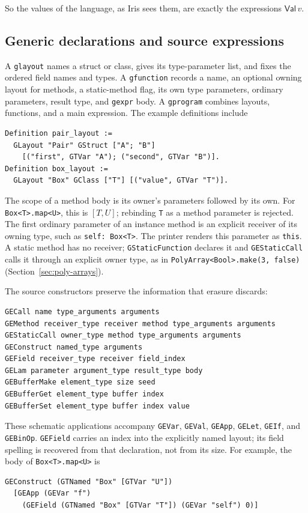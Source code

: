 \documentclass[11pt]{article}
\begin{document}
So the values of the language, as Iris sees them, are exactly the expressions \(\mathsf{Val}\,v\).

\subsection{Generic declarations and source expressions}
\label{sec:generic-source}

A \texttt{glayout} names a struct or class, gives its type-parameter list,
and fixes the ordered field names and types. A \texttt{gfunction} records
a name, an optional owning layout for methods, a static-method flag, its own type parameters,
ordinary parameters, result type, and \texttt{gexpr} body. A \texttt{gprogram}
combines layouts, functions, and a main expression. The example definitions
include
\begin{lstlisting}
Definition pair_layout :=
  GLayout "Pair" GStruct ["A"; "B"]
    [("first", GTVar "A"); ("second", GTVar "B")].
Definition box_layout :=
  GLayout "Box" GClass ["T"] [("value", GTVar "T")].
\end{lstlisting}
The scope of a method body is its owner's parameters followed by its own.
For \texttt{Box<T>.map<U>}, this is \([T,U]\); rebinding \texttt{T} as a
method parameter is rejected. The first ordinary parameter of an instance method is
an explicit receiver of its owning type, such as \texttt{self: Box<T>}.
The printer renders this parameter as \texttt{this}. A static method has
no receiver; \texttt{GStaticFunction} declares it and \texttt{GEStaticCall}
calls it through an explicit owner type, as in
\texttt{PolyArray<Bool>.make(3, false)} (Section~\ref{sec:poly-arrays}).

The source constructors preserve the information that erasure discards:
\begin{lstlisting}
GECall name type_arguments arguments
GEMethod receiver_type receiver method type_arguments arguments
GEStaticCall owner_type method type_arguments arguments
GEConstruct named_type arguments
GEField receiver_type receiver field_index
GELam parameter argument_type result_type body
GEBufferMake element_type size seed
GEBufferGet element_type buffer index
GEBufferSet element_type buffer index value
\end{lstlisting}
These schematic applications accompany \texttt{GEVar}, \texttt{GEVal},
\texttt{GEApp}, \texttt{GELet}, \texttt{GEIf}, and \texttt{GEBinOp}.
\texttt{GEField} carries an index into the explicitly named layout; its
field spelling is recovered from that declaration, not from its size.
For example, the body of \texttt{Box<T>.map<U>} is
\begin{lstlisting}
GEConstruct (GTNamed "Box" [GTVar "U"])
  [GEApp (GEVar "f")
    (GEField (GTNamed "Box" [GTVar "T"]) (GEVar "self") 0)]
\end{lstlisting}
\end{document}
